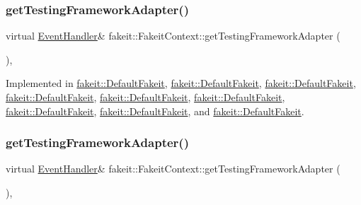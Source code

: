 \subsubsection{\texorpdfstring{getTestingFrameworkAdapter()}{getTestingFrameworkAdapter()}\hspace{0.1cm}{\footnotesize\ttfamily [4/9]}}
{\footnotesize\ttfamily virtual \mbox{\hyperlink{structfakeit_1_1EventHandler}{Event\+Handler}}\& fakeit\+::\+Fakeit\+Context\+::get\+Testing\+Framework\+Adapter (\begin{DoxyParamCaption}{ }\end{DoxyParamCaption})\hspace{0.3cm}{\ttfamily [protected]}, {}}



Implemented in \mbox{\hyperlink{classfakeit_1_1DefaultFakeit_af01d86eee74123b4794c07aac3767ad7}{fakeit\+::\+Default\+Fakeit}}, \mbox{\hyperlink{classfakeit_1_1DefaultFakeit_af01d86eee74123b4794c07aac3767ad7}{fakeit\+::\+Default\+Fakeit}}, \mbox{\hyperlink{classfakeit_1_1DefaultFakeit_af01d86eee74123b4794c07aac3767ad7}{fakeit\+::\+Default\+Fakeit}}, \mbox{\hyperlink{classfakeit_1_1DefaultFakeit_af01d86eee74123b4794c07aac3767ad7}{fakeit\+::\+Default\+Fakeit}}, \mbox{\hyperlink{classfakeit_1_1DefaultFakeit_af01d86eee74123b4794c07aac3767ad7}{fakeit\+::\+Default\+Fakeit}}, \mbox{\hyperlink{classfakeit_1_1DefaultFakeit_af01d86eee74123b4794c07aac3767ad7}{fakeit\+::\+Default\+Fakeit}}, \mbox{\hyperlink{classfakeit_1_1DefaultFakeit_af01d86eee74123b4794c07aac3767ad7}{fakeit\+::\+Default\+Fakeit}}, \mbox{\hyperlink{classfakeit_1_1DefaultFakeit_af01d86eee74123b4794c07aac3767ad7}{fakeit\+::\+Default\+Fakeit}}, and \mbox{\hyperlink{classfakeit_1_1DefaultFakeit_af01d86eee74123b4794c07aac3767ad7}{fakeit\+::\+Default\+Fakeit}}.

\mbox{\label{structfakeit_1_1FakeitContext_a4be017ccd6c80cdafc02bd1985f183c8}} 
\subsubsection{\texorpdfstring{getTestingFrameworkAdapter()}{getTestingFrameworkAdapter()}\hspace{0.1cm}{\footnotesize\ttfamily [5/9]}}
{\footnotesize\ttfamily virtual \mbox{\hyperlink{structfakeit_1_1EventHandler}{Event\+Handler}}\& fakeit\+::\+Fakeit\+Context\+::get\+Testing\+Framework\+Adapter (\begin{DoxyParamCaption}{ }\end{DoxyParamCaption})\hspace{0.3cm}{\ttfamily [protected]}, {}}



